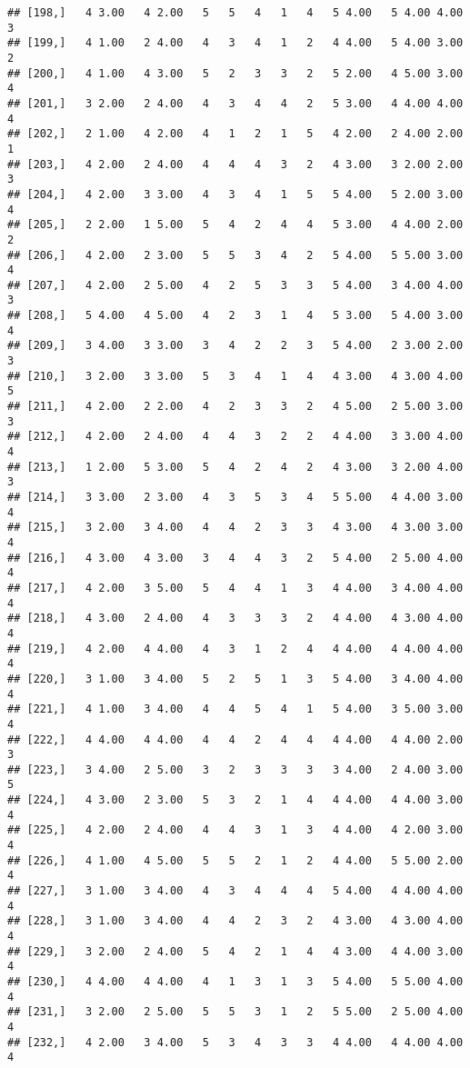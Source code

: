 \documentclass[]{article}
\begin{document}
\begin{verbatim}
## [198,]   4 3.00   4 2.00   5   5   4   1   4   5 4.00   5 4.00 4.00   3
## [199,]   4 1.00   2 4.00   4   3   4   1   2   4 4.00   5 4.00 3.00   2
## [200,]   4 1.00   4 3.00   5   2   3   3   2   5 2.00   4 5.00 3.00   4
## [201,]   3 2.00   2 4.00   4   3   4   4   2   5 3.00   4 4.00 4.00   4
## [202,]   2 1.00   4 2.00   4   1   2   1   5   4 2.00   2 4.00 2.00   1
## [203,]   4 2.00   2 4.00   4   4   4   3   2   4 3.00   3 2.00 2.00   3
## [204,]   4 2.00   3 3.00   4   3   4   1   5   5 4.00   5 2.00 3.00   4
## [205,]   2 2.00   1 5.00   5   4   2   4   4   5 3.00   4 4.00 2.00   2
## [206,]   4 2.00   2 3.00   5   5   3   4   2   5 4.00   5 5.00 3.00   4
## [207,]   4 2.00   2 5.00   4   2   5   3   3   5 4.00   3 4.00 4.00   3
## [208,]   5 4.00   4 5.00   4   2   3   1   4   5 3.00   5 4.00 3.00   4
## [209,]   3 4.00   3 3.00   3   4   2   2   3   5 4.00   2 3.00 2.00   3
## [210,]   3 2.00   3 3.00   5   3   4   1   4   4 3.00   4 3.00 4.00   5
## [211,]   4 2.00   2 2.00   4   2   3   3   2   4 5.00   2 5.00 3.00   3
## [212,]   4 2.00   2 4.00   4   4   3   2   2   4 4.00   3 3.00 4.00   4
## [213,]   1 2.00   5 3.00   5   4   2   4   2   4 3.00   3 2.00 4.00   3
## [214,]   3 3.00   2 3.00   4   3   5   3   4   5 5.00   4 4.00 3.00   4
## [215,]   3 2.00   3 4.00   4   4   2   3   3   4 3.00   4 3.00 3.00   4
## [216,]   4 3.00   4 3.00   3   4   4   3   2   5 4.00   2 5.00 4.00   4
## [217,]   4 2.00   3 5.00   5   4   4   1   3   4 4.00   3 4.00 4.00   4
## [218,]   4 3.00   2 4.00   4   3   3   3   2   4 4.00   4 3.00 4.00   4
## [219,]   4 2.00   4 4.00   4   3   1   2   4   4 4.00   4 4.00 4.00   4
## [220,]   3 1.00   3 4.00   5   2   5   1   3   5 4.00   3 4.00 4.00   4
## [221,]   4 1.00   3 4.00   4   4   5   4   1   5 4.00   3 5.00 3.00   4
## [222,]   4 4.00   4 4.00   4   4   2   4   4   4 4.00   4 4.00 2.00   3
## [223,]   3 4.00   2 5.00   3   2   3   3   3   3 4.00   2 4.00 3.00   5
## [224,]   4 3.00   2 3.00   5   3   2   1   4   4 4.00   4 4.00 3.00   4
## [225,]   4 2.00   2 4.00   4   4   3   1   3   4 4.00   4 2.00 3.00   4
## [226,]   4 1.00   4 5.00   5   5   2   1   2   4 4.00   5 5.00 2.00   4
## [227,]   3 1.00   3 4.00   4   3   4   4   4   5 4.00   4 4.00 4.00   4
## [228,]   3 1.00   3 4.00   4   4   2   3   2   4 3.00   4 3.00 4.00   4
## [229,]   3 2.00   2 4.00   5   4   2   1   4   4 3.00   4 4.00 3.00   4
## [230,]   4 4.00   4 4.00   4   1   3   1   3   5 4.00   5 5.00 4.00   4
## [231,]   3 2.00   2 5.00   5   5   3   1   2   5 5.00   2 5.00 4.00   4
## [232,]   4 2.00   3 4.00   5   3   4   3   3   4 4.00   4 4.00 4.00   4

\end{verbatim}
\end{document}
